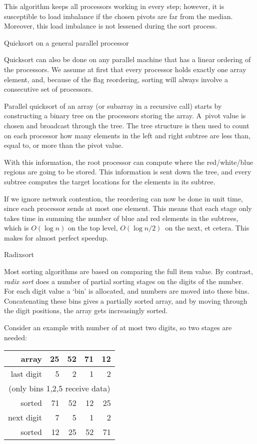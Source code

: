 This algorithm keeps all processors working in every step; however, it
is susceptible to load imbalance if the chosen pivots are far from the
median. Moreover, this load imbalance is not lessened during the sort
process.

 {Quicksort on a general parallel processor}

Quicksort can also be done on any parallel machine that has a linear
ordering of the processors. We assume at first that every processor
holds exactly one array element, and, because of the flag reordering,
sorting will always involve a consecutive set of processors.

Parallel quicksort of an array (or subarray in a recursive call)
starts by constructing a binary tree on the processors storing the
array. A~pivot value is chosen and broadcast through the tree. The
tree structure is then used to count on each processor how many
elements in the left and right subtree are less than, equal to, or
more than the pivot value. 

With this information, the root processor can compute where the
red/white/blue regions are going to be stored. This information is
sent down the tree, and every subtree computes the target locations
for the elements in its subtree.

If we ignore network contention, the reordering can now be done in
unit time, since each processor sends at most one element. This means
that each stage only takes time in summing the number of blue and red
elements in the subtrees, which is $O(\log n)$ on the top level,
$O(\log n/2)$~on the next, et cetera. This makes for almost perfect
speedup.


 {Radixsort}
\label{sec:radixsort}

Most sorting algorithms are based on comparing the full item value. By
contrast, \emph{radix sort} does a number of partial sorting stages on
the digits of the number. For each digit value a `bin' is allocated,
and numbers are moved into these bins. Concatenating these bins gives
a partially sorted array, and by moving through the digit
positions, the array gets increasingly sorted.

Consider an example with number of at most two digits, so two stages
are needed:

\begin{tabular}{|r|rrrr|}
  \hline
  array     & 25&52&71&12\\
  \hline
  last digit&  5& 2& 1& 2\\
  \multicolumn{5}{|c|}{(only bins 1,2,5 receive data)}\\
  sorted    & 71&52&12&25\\
  next digit&  7& 5& 1& 2\\
  sorted    & 12&25&52&71\\
  \hline
\end{tabular}

